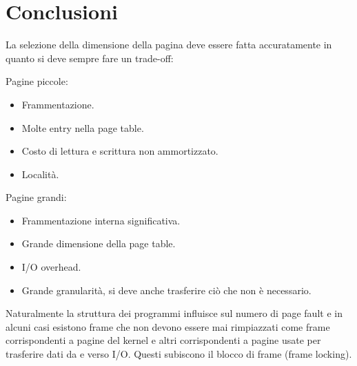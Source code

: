 \section{Conclusioni}
La selezione della dimensione della pagina deve essere fatta accuratamente in quanto si deve sempre fare un trade-off:
\begin{multicols}{2}
	Pagine piccole:
	\begin{itemize}
		\item Frammentazione.
		\item Molte entry nella page table. 
		\item Costo di lettura e scrittura non ammortizzato.
		\item Localit\`a.
	\end{itemize}
	\columnbreak
	Pagine grandi:
	\begin{itemize}
		\item Frammentazione interna significativa.
		\item Grande dimensione della page table.
		\item I/O overhead.
		\item Grande granularit\`a, si deve anche trasferire ci\`o che non \`e necessario.
	\end{itemize}
\end{multicols}
Naturalmente la struttura dei programmi influisce sul numero di page fault e in alcuni casi esistono frame che non devono essere mai rimpiazzati come frame corrispondenti a pagine del
kernel e altri corrispondenti a pagine usate per trasferire dati da e verso I/O. Questi subiscono il blocco di frame (frame locking). 
